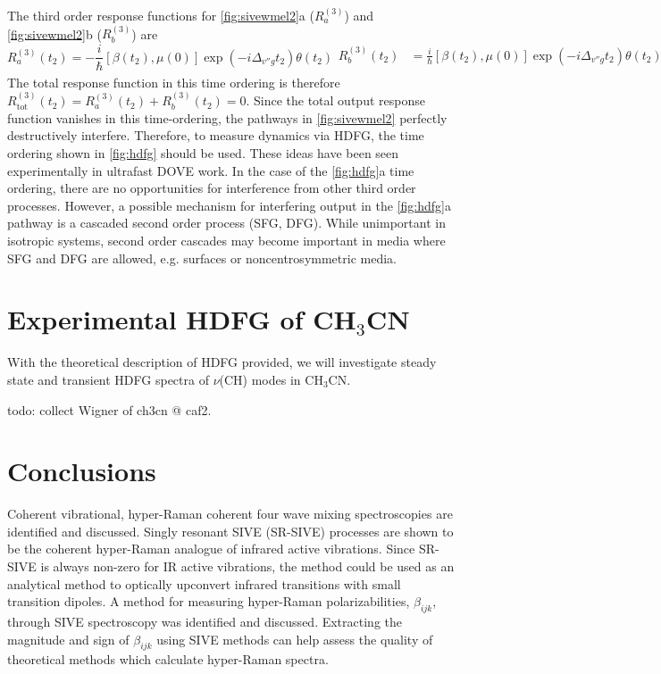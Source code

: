 \documentclass[aip, jcp, reprint, twocolumn]{revtex4-2}
\begin{document}
The third order response functions for \autoref{fig:sivewmel2}a ($R^{(3)}_{a}$) and \autoref{fig:sivewmel2}b ($R^{(3)}_{b}$) are 
\begin{subequations}
	\begin{equation} \label{mixing:a}
		R^{(3)}_{a} (t_2) = -\frac{i}{\hbar} [\beta(t_2), \mu(0)] \exp(-i\Delta_{v''g}t_2) \theta(t_2)
	\end{equation}
	\begin{equation}\label{mixing:b}
		\begin{split}
			R^{(3)}_{b} (t_2) & = \frac{i}{\hbar} [\beta(t_2), \mu(0)] \exp(-i\Delta_{v''g}t_2) \theta(t_2)\\
		\end{split}
	\end{equation}
\end{subequations}
The total response function in this time ordering is therefore $R^{(3)}_\text{tot} (t_2) = R^{(3)}_{a} (t_2) + R^{(3)}_{b} (t_2) = 0$. 
Since the total output response function vanishes in this time-ordering, the pathways in \autoref{fig:sivewmel2} perfectly destructively interfere.
Therefore, to measure dynamics via HDFG, the time ordering shown in \autoref{fig:hdfg} should be used.
These ideas have been seen experimentally in ultrafast DOVE work. \cite{RN367, McDonnell2024}
In the case of the \autoref{fig:hdfg}a time ordering, there are no opportunities for interference from other third order processes. 
However, a possible mechanism for interfering output in the \autoref{fig:hdfg}a pathway is a cascaded second order process (SFG, DFG). \cite{RN243, RN300}
While unimportant in isotropic systems, second order cascades may become important in media where SFG and DFG are allowed, e.g. surfaces or noncentrosymmetric media. 


\section{Experimental HDFG of CH$_3$CN}\label{Expt}
With the theoretical description of HDFG provided, we will investigate steady state and transient HDFG spectra of $\nu$(CH) modes in CH$_3$CN. 


todo: collect Wigner of ch3cn @ caf2. 


\section{Conclusions}%
Coherent vibrational, hyper-Raman coherent four wave mixing spectroscopies are identified and discussed.
Singly resonant SIVE (SR-SIVE) processes are shown to be the coherent hyper-Raman analogue of infrared active vibrations.
Since SR-SIVE is always non-zero for IR active vibrations, the method could be used as an analytical method to optically upconvert infrared transitions with small transition dipoles.
A method for measuring hyper-Raman polarizabilities, $\beta_{ijk}$, through SIVE spectroscopy was identified and discussed.
Extracting the magnitude and sign of $\beta_{ijk}$ using SIVE methods can help assess the quality of theoretical methods which calculate hyper-Raman spectra. 
\end{document}
